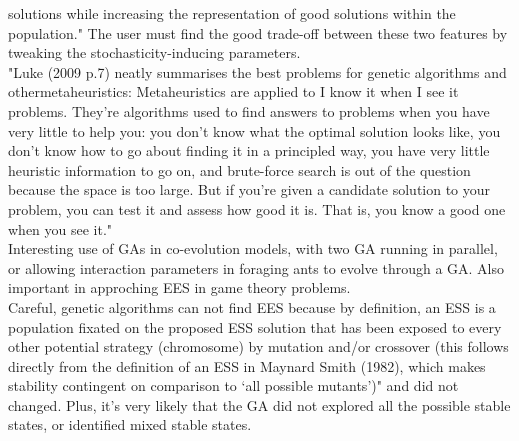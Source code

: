 \documentclass[12pt]{article}
\begin{document}
solutions while increasing the representation of good solutions
within the population." The user must find the good trade-off between these two features by tweaking the stochasticity-inducing parameters.\\
"Luke (2009 p.7) neatly summarises the best problems for
genetic algorithms and othermetaheuristics:
Metaheuristics are applied to I know it when I see it problems.
They’re algorithms used to find answers to problems
when you have very little to help you: you don’t know what
the optimal solution looks like, you don’t know how to go
about finding it in a principled way, you have very little
heuristic information to go on, and brute-force search is
out of the question because the space is too large. But if
you’re given a candidate solution to your problem, you can
test it and assess how good it is. That is, you know a good
one when you see it."\\
Interesting use of GAs in co-evolution models, with two GA running in parallel, or allowing interaction parameters in foraging ants to evolve through a GA. Also important in approching EES in game theory problems.\\
Careful, genetic algorithms can not find EES because by definition, an ESS is a population
fixated on the proposed ESS solution that has been exposed
to every other potential strategy (chromosome) by mutation
and/or crossover (this follows directly from the definition of an
ESS in Maynard Smith (1982), which makes stability contingent
on comparison to ‘all possible mutants’)" and did not changed. Plus, it's very likely that the GA did not explored all the possible stable states, or identified mixed stable states.
 
\end{document}

